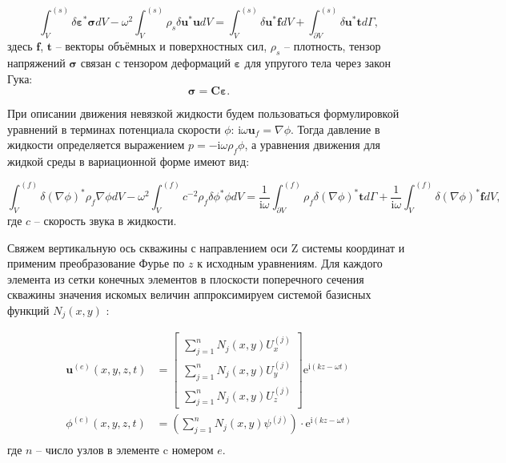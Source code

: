 \documentclass[a4paper,11pt]{article}
\newcommand{\ii}{\mathrm{i}}
\begin{document}
\begin{equation}
\int_{V}^{(s)}\delta \boldsymbol{\varepsilon}^* \boldsymbol{\sigma} dV - \omega^2 \int_{V}^{(s)} \rho_s \delta \mathbf{u}^*\mathbf{u}dV = \int_{V}^{(s)}\delta \mathbf{u}^* \mathbf{f} dV + \int_{\partial V}^{(s)}\delta \mathbf{u}^* \mathbf{t} d\Gamma, \label{var_eq_solid}
\end{equation}
здесь $\mathbf{f}$, $\mathbf{t}$ -- векторы объёмных и поверхностных сил, $\rho_s$ -- плотность, тензор напряжений $\boldsymbol{\sigma}$ связан с тензором деформаций $\boldsymbol{\varepsilon}$ для упругого тела через закон Гука:
$$
\boldsymbol{\sigma} = \mathbf{C}\boldsymbol{\varepsilon}.
$$

При описании движения невязкой жидкости будем пользоваться формулировкой уравнений в терминах потенциала скорости $\phi$: $\ii \omega \mathbf{u}_f = \nabla \phi$. Тогда давление в жидкости определяется выражением $p = -\ii \omega \rho_f \phi$, а уравнения движения для жидкой среды в вариационной форме имеют вид: 

\begin{equation}
\int_{V}^{(f)} \delta (\nabla\phi)^* \rho_f  \nabla \phi dV - \omega^2 \int_{V}^{(f)}  c^{-2} \rho_f \delta \phi^*  \phi dV = \frac{1}{\ii\omega}\int_{\partial V}^{(f)} \rho_f \delta(\nabla \phi)^* \mathbf{t} d\Gamma + \frac{1}{\ii\omega} \int_{V}^{(f)} \delta(\nabla \phi)^* \mathbf{f} dV, \label{var_eq_fluid}
\end{equation}
где $c$ -- скорость звука в жидкости.

Свяжем вертикальную ось скважины с направлением оси Z системы координат и применим преобразование Фурье по $z$ к исходным уравнениям. Для каждого элемента из сетки конечных элементов в плоскости поперечного сечения скважины значения искомых величин аппроксимируем системой базисных функций $N_j(x,y)$ \cite{Zienkiewicz2000}:

\begin{equation}
\begin{split}
\mathbf{u}^{(e)}(x,y,z,t) &= \left[
\begin{array}{c}
\sum_{j=1}^{n}N_j(x,y)U_{x}^{(j)} \\
\sum_{j=1}^{n}N_j(x,y)U_{y}^{(j)} \\
\sum_{j=1}^{n}N_j(x,y)U_{z}^{(j)} 
\end{array}
\right] \mathrm{e}^{\ii (kz-\omega t)} %
\\
\phi^{(e)}(x,y,z,t) &= \left(\sum_{j=1}^{n}N_j(x,y)\psi^{(j)} \right) \cdot \mathrm{e}^{\ii (kz-\omega t)} %
\\
\end{split} \label{eq:unknown_var}
\end{equation}
где $n$ -- число узлов в элементе c номером $e$.  
\end{document}
